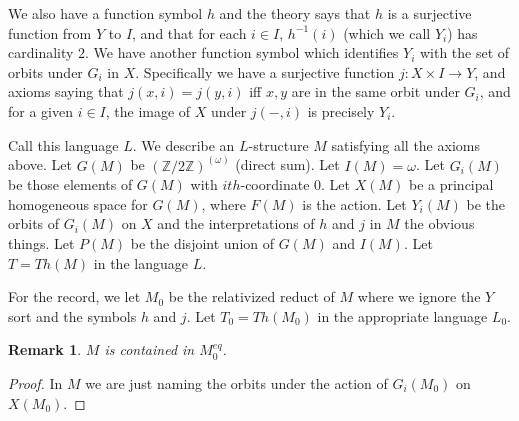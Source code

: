 \documentclass[12pt]{article}
\newtheorem{Remark}[Theorem]{Remark}
\newcommand{\Z}{\mathbb Z}  \newcommand{\Zz}{\mathbb Z}
\begin{document}
We also have a function symbol $h$ and the theory says that $h$ is a surjective function from $Y$ to $I$, and that for each $i\in I$, $h^{-1}(i)$ (which we call $Y_{i}$) has cardinality $2$.  We have another function symbol which identifies  $Y_{i}$ with the  set of orbits under $G_{i}$ in $X$. Specifically we have a surjective function $j:X\times I \to Y$, and axioms saying that  $j(x,i) = j(y,i)$ iff $x,y$ are in the same orbit under $G_{i}$, and for a given $i\in I$, the image of $X$ under $j(-,i)$ is precisely $Y_{i}$. 

Call this language $L$.  We describe an $L$-structure $M$ satisfying all the axioms above. Let $G(M)$ be $(\Z/2\Z)^{(\omega)}$  (direct sum). Let  $I(M) = \omega$.  Let $G_{i}(M)$ be  those elements of $G(M)$ with $ith$-coordinate 
$0$.  Let $X(M)$ be a principal homogeneous space for $G(M)$, where $F(M)$ is the action.  Let $Y_{i}(M)$ be the orbits of $G_{i}(M)$ on $X$ and the interpretations of $h$ and $j$ in $M$ the obvious things. 
Let $P(M)$ be the disjoint union of $G(M)$ and $I(M)$.
Let $T = Th(M)$ in the language $L$. 

For the record, we let $M_{0}$ be the relativized reduct of $M$ where we ignore the $Y$  sort and the symbols $h$ and $j$. 
Let $T_{0} = Th(M_{0})$ in the appropriate language $L_{0}$. 

\begin{Remark} $M$ is contained in $M_{0}^{eq}$.
\end{Remark}
\begin{proof} In $M$ we are just naming the orbits under the action of $G_{i}(M_{0})$ on $X(M_{0})$. 
\end{proof}
\end{document}
